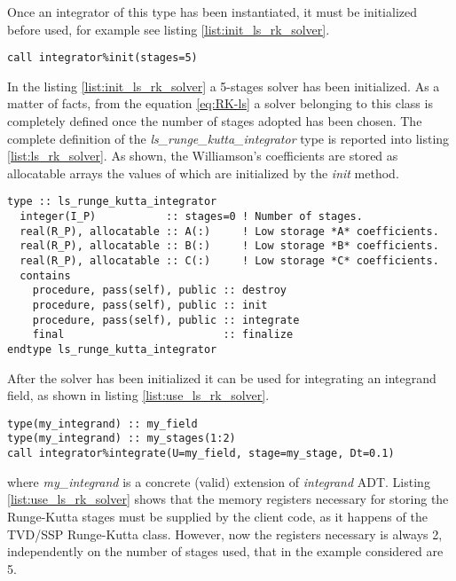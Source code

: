 \documentclass[pdftex,preprint,3p,times,numbers]{elsarticle}
\begin{document}
Once an integrator of this type has been instantiated, it must be initialized before used, for example see listing \ref{list:init_ls_rk_solver}.

\begin{lstlisting}[firstnumber=1,style=code,caption={example of initialization of an explicit low storage Runge-Kutta integrator},label={list:init_ls_rk_solver}]
call integrator%init(stages=5)
\end{lstlisting}

In the listing \ref{list:init_ls_rk_solver} a 5-stages solver has been initialized. As a matter of facts, from the equation \ref{eq:RK-ls} a solver belonging to this class is completely defined once the number of stages adopted has been chosen. The complete definition of the \emph{ls\_runge\_kutta\_integrator} type is reported into listing \ref{list:ls_rk_solver}. As shown, the Williamson's coefficients are stored as allocatable arrays the values of which are initialized by the \emph{init} method.

\begin{lstlisting}[firstnumber=1,style=code,caption={definition of \emph{ls\_runge\_kutta\_integrator} type},label={list:ls_rk_solver}]
type :: ls_runge_kutta_integrator
  integer(I_P)           :: stages=0 ! Number of stages.
  real(R_P), allocatable :: A(:)     ! Low storage *A* coefficients.
  real(R_P), allocatable :: B(:)     ! Low storage *B* coefficients.
  real(R_P), allocatable :: C(:)     ! Low storage *C* coefficients.
  contains
    procedure, pass(self), public :: destroy
    procedure, pass(self), public :: init
    procedure, pass(self), public :: integrate
    final                         :: finalize
endtype ls_runge_kutta_integrator
\end{lstlisting}

After the solver has been initialized it can be used for integrating an integrand field, as shown in listing \ref{list:use_ls_rk_solver}.

\begin{lstlisting}[firstnumber=1,style=code,caption={example of usage of a low storage Runge-Kutta integrator},label={list:use_ls_rk_solver}]
type(my_integrand) :: my_field
type(my_integrand) :: my_stages(1:2)
call integrator%integrate(U=my_field, stage=my_stage, Dt=0.1)
\end{lstlisting}
where \emph{my\_integrand} is a concrete (valid) extension of \emph{integrand} ADT. Listing \ref{list:use_ls_rk_solver} shows that the memory registers necessary for storing the Runge-Kutta stages must be supplied by the client code, as it happens of the TVD/SSP Runge-Kutta class. However, now the registers necessary is always 2, independently on the number of stages used, that in the example considered are 5.
\end{document}
